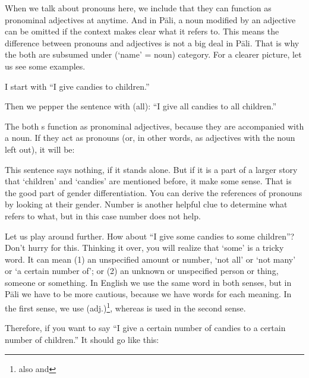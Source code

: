 When we talk about pronouns here, we include that they can function as pronominal adjectives at anytime. And in P\=ali, a noun modified by an adjective can be omitted if the context makes clear what it refers to. This means the difference between pronouns and adjectives is not a big deal in P\=ali. That is why the both are subsumed under  (`name' = noun) category. For a clearer picture, let us see some examples.

I start with ``I give candies to children.''


Then we pepper the sentence with  (all): ``I give all candies to all children.''


The both s function as pronominal adjectives, because they are accompanied with a noun. If they act as pronouns (or, in other words, as adjectives with the noun left out), it will be:


This sentence says nothing, if it stands alone. But if it is a part of a larger story that `children' and `candies' are mentioned before, it make some sense. That is the good part of gender differentiation. You can derive the references of pronouns by looking at their gender. Number is another helpful clue to determine what refers to what, but in this case number does not help.

Let us play around further. How about ``I give some candies to some children''? Don't hurry for this. Thinking it over, you will realize that `some' is a tricky word. It can mean (1) an unspecified amount or number, `not all' or `not many' or `a certain number of'; or (2) an unknown or unspecified person or thing, someone or something. In English we use the same word in both senses, but in P\=ali we have to be more cautious, because we have words for each meaning. In the first sense, we use  (adj.)\footnote{also  and }, whereas  is used in the second sense.

Therefore, if you want to say ``I give a certain number of candies to a certain number of children.'' It should go like this:


